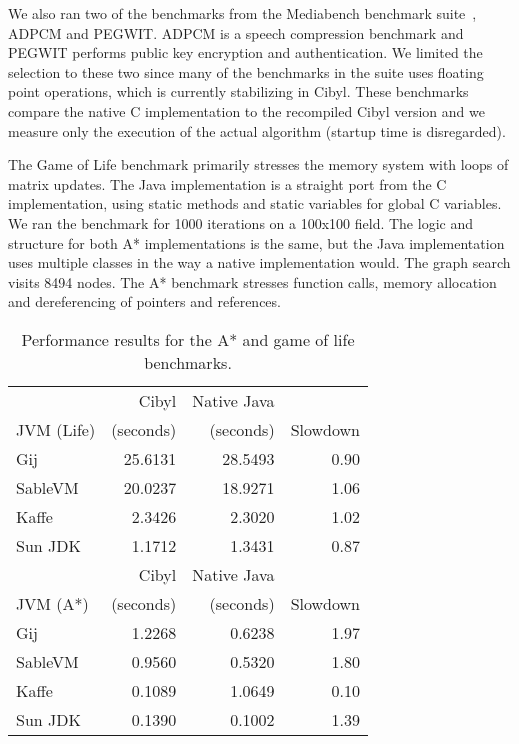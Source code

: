 We also ran two of the benchmarks from the Mediabench benchmark
suite~\cite{lee97mediabench}, ADPCM and PEGWIT. ADPCM is a speech compression
benchmark and PEGWIT performs public key encryption and authentication. We
limited the selection to these two since many of the benchmarks in the suite
uses floating point operations, which is currently stabilizing in Cibyl. These
benchmarks compare the native C implementation to the recompiled Cibyl version
and we measure only the execution of the actual algorithm (startup time is
disregarded).

The Game of Life benchmark primarily stresses the memory system with loops of
matrix updates. The Java implementation is a straight port from the C
implementation, using static methods and static variables for global C
variables. We ran the benchmark for 1000 iterations on a 100x100 field.  The
logic and structure for both A* implementations is the same, but the Java
implementation uses multiple classes in the way a native implementation would.
The graph search visits 8494 nodes. The A* benchmark stresses function calls,
memory allocation and dereferencing of pointers and references.

\begin{table*}[htb]
  \centering
  \caption[A* and game of life benchmarks]{Performance results for the A* and game of life benchmarks.}
  \begin{tabular}{lrr|r}
                & Cibyl     & Native Java &            \\
    JVM (Life)  & (seconds) & (seconds)   & Slowdown   \\
    \hline
    Gij         & 25.6131   & 28.5493     & 0.90       \\
    SableVM     & 20.0237   & 18.9271     & 1.06       \\
    Kaffe       &  2.3426   &  2.3020     & 1.02       \\
    Sun JDK     &  1.1712   &  1.3431     & 0.87       \\
    \hline
    \hline
         & Cibyl     & Native Java &        \\
JVM (A*) & (seconds) & (seconds) & Slowdown \\
\hline
Gij      & 1.2268    & 0.6238    & 1.97     \\
SableVM  & 0.9560    & 0.5320    & 1.80     \\
Kaffe    & 0.1089    & 1.0649    & 0.10     \\
Sun JDK  & 0.1390    & 0.1002    & 1.39
  \end{tabular}
  \label{tab:performance}
\end{table*}

